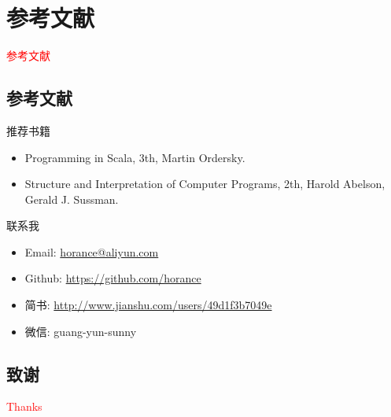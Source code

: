 \section{参考文献}
\label{sec:reference}

\begin{frame}
  \begin{center}
    \Huge{\textcolor{red}{参考文献}}
  \end{center}
\end{frame}

\subsection{参考文献}

\begin{frame}{推荐书籍}
    \begin{itemize}
    \item \alert{Programming in Scala, 3th}, Martin Ordersky.
    \item \alert{Structure and Interpretation of Computer Programs, 2th}, Harold Abelson, Gerald J. Sussman.
    \end{itemize}
\end{frame}

\begin{frame}{联系我}
    \begin{itemize}
    \item \alert{Email}: \href{horance@aliyun.com}{horance@aliyun.com}
    \item \alert{Github}: \href{https://github.com/horance}{https://github.com/horance}    
    \item \alert{简书}: \href{http://www.jianshu.com/users/49d1f3b7049e}{http://www.jianshu.com/users/49d1f3b7049e}
    \item \alert{微信}: guang-yun-sunny
    \end{itemize}
\end{frame}

\subsection{致谢}

\begin{frame}{}
  \begin{center}
    \Huge{\textcolor{red}{Thanks}}
  \end{center}
\end{frame}